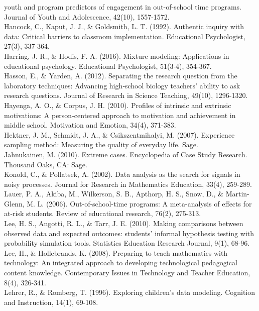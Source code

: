 \documentclass[]{book}
\theoremstyle{definition}
\theoremstyle{definition}
\theoremstyle{definition}
\theoremstyle{remark}
\begin{document}
youth and program predictors of engagement in out-of-school time
programs. Journal of Youth and Adolescence, 42(10), 1557-1572.\\
Hancock, C., Kaput, J. J., \& Goldsmith, L. T. (1992). Authentic inquiry
with data: Critical barriers to classroom implementation. Educational
Psychologist, 27(3), 337-364.\\
Harring, J. R., \& Hodis, F. A. (2016). Mixture modeling: Applications
in educational psychology. Educational Psychologist, 51(3-4), 354-367.\\
Hasson, E., \& Yarden, A. (2012). Separating the research question from
the laboratory techniques: Advancing high‐school biology teachers'
ability to ask research questions. Journal of Research in Science
Teaching, 49(10), 1296-1320.\\
Hayenga, A. O., \& Corpus, J. H. (2010). Profiles of intrinsic and
extrinsic motivations: A person-centered approach to motivation and
achievement in middle school. Motivation and Emotion, 34(4), 371-383.\\
Hektner, J. M., Schmidt, J. A., \& Csikszentmihalyi, M. (2007).
Experience sampling method: Measuring the quality of everyday life.
Sage.\\
Jahnukainen, M. (2010). Extreme cases. Encyclopedia of Case Study
Research. Thousand Oaks, CA: Sage.\\
Konold, C., \& Pollatsek, A. (2002). Data analysis as the search for
signals in noisy processes. Journal for Research in Mathematics
Education, 33(4), 259-289.\\
Lauer, P. A., Akiba, M., Wilkerson, S. B., Apthorp, H. S., Snow, D., \&
Martin-Glenn, M. L. (2006). Out-of-school-time programs: A meta-analysis
of effects for at-risk students. Review of educational research, 76(2),
275-313.\\
Lee, H. S., Angotti, R. L., \& Tarr, J. E. (2010). Making comparisons
between observed data and expected outcomes: students' informal
hypothesis testing with probability simulation tools. Statistics
Education Research Journal, 9(1), 68-96.\\
Lee, H., \& Hollebrands, K. (2008). Preparing to teach mathematics with
technology: An integrated approach to developing technological
pedagogical content knowledge. Contemporary Issues in Technology and
Teacher Education, 8(4), 326-341.\\
Lehrer, R., \& Romberg, T. (1996). Exploring children's data modeling.
Cognition and Instruction, 14(1), 69-108.\\
\end{document}
